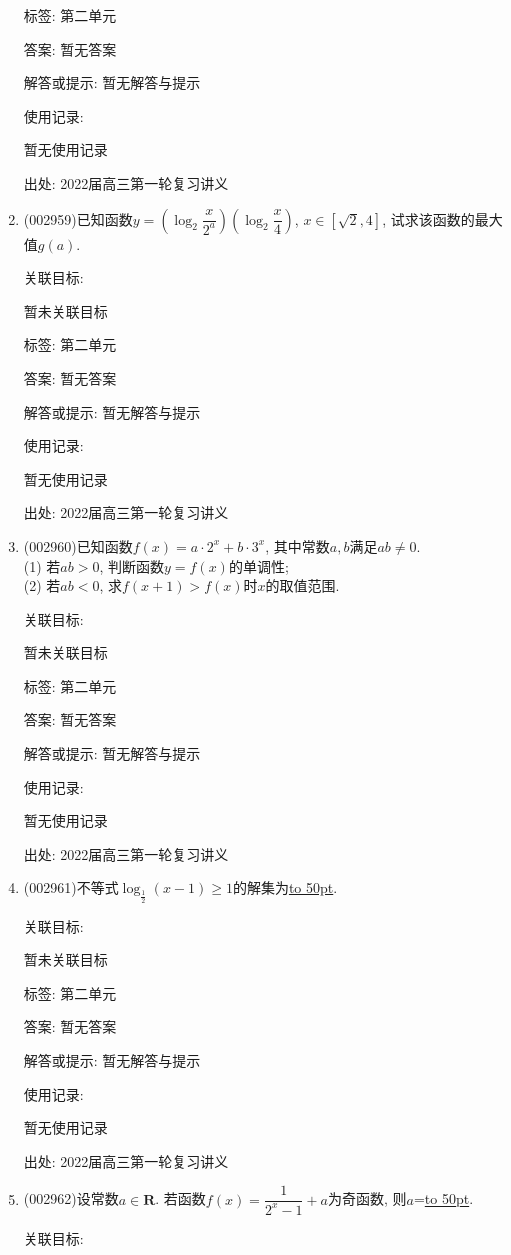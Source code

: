 \documentclass[10pt,a4paper]{article}
\newcommand{\blank}[1]{\underline{\hbox to #1pt{}}}
\begin{document}
\begin{enumerate}[1.]
标签: 第二单元

答案: 暂无答案

解答或提示: 暂无解答与提示

使用记录:

暂无使用记录


出处: 2022届高三第一轮复习讲义
\item { (002959)}已知函数$y=(\log_2\dfrac x{2^a})(\log_2\dfrac x4)$, $x\in [\sqrt 2,4]$, 试求该函数的最大值$g(a)$.


关联目标:

暂未关联目标



标签: 第二单元

答案: 暂无答案

解答或提示: 暂无解答与提示

使用记录:

暂无使用记录


出处: 2022届高三第一轮复习讲义
\item { (002960)}已知函数$f(x)=a\cdot 2^x+b\cdot 3^x$, 其中常数$a,b$满足$ab\ne 0$.\\
(1) 若$ab>0$, 判断函数$y=f(x)$的单调性;\\
(2) 若$ab<0$, 求$f(x+1)>f(x)$时$x$的取值范围.


关联目标:

暂未关联目标



标签: 第二单元

答案: 暂无答案

解答或提示: 暂无解答与提示

使用记录:

暂无使用记录


出处: 2022届高三第一轮复习讲义
\item { (002961)}不等式$\log_{\frac 12}(x-1)\ge 1$的解集为\blank{50}.


关联目标:

暂未关联目标



标签: 第二单元

答案: 暂无答案

解答或提示: 暂无解答与提示

使用记录:

暂无使用记录


出处: 2022届高三第一轮复习讲义
\item { (002962)}设常数$a\in \mathbf{R}$. 若函数$f(x)=\dfrac 1{2^x-1}+a$为奇函数, 则$a$=\blank{50}.


关联目标:


\end{enumerate}
\end{document}
